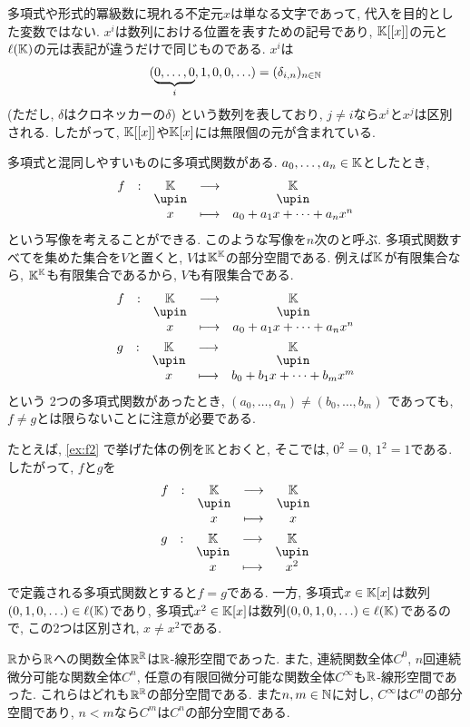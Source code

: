 \begin{remark}
  多項式や形式的冪級数に現れる不定元$x$は単なる文字であって,
  代入を目的とした変数ではない.
  $x^i$は数列における位置を表すための記号であり,
  $\mathbb{K}[[x]]$の元と$\ell(\mathbb{K})$の元は表記が違うだけで同じものである.
  $x^i$は
  \begin{align*}
  (\underbrace{0,\ldots,0}_{i},1,0,0,\ldots)=(\delta_{i,n})_{n\in\mathbb{N}}
  \end{align*}
  (ただし, $\delta$はクロネッカーの$\delta$)
  という数列を表しており,
  $j\neq i$なら$x^i$と$x^j$は区別される.
  したがって,
  $\mathbb{K}[[x]]$や$\mathbb{K}[x]$には無限個の元が含まれている.

  多項式と混同しやすいものに多項式関数がある.
  $a_0,\ldots, a_n\in \mathbb{K}$としたとき,
  \begin{align*}
  \shazo{f}{\KK}{\KK}
  {x}{a_0+a_1x+\cdots+a_nx^n}
  \end{align*}
  という写像を考えることができる.
  このような写像を$n$次のと呼ぶ.
  多項式関数すべてを集めた集合を$V$と置くと,
  $V$は$\mathbb{K}^{\mathbb{K}}$の部分空間である.
  例えば$\mathbb{K}$が有限集合なら,
  $\mathbb{K}^{\mathbb{K}}$も有限集合であるから,
  $V$も有限集合である.
  \begin{align*}
  &\shazo{f}{\KK}{\KK}
  {x}{a_0+a_1x+\cdots+a_nx^n}
  \\
  &\shazo{g}{\KK}{\KK}
  {x}{b_0+b_1x+\cdots+b_mx^m}
  \end{align*}
  という
  2つの多項式関数があったとき,
  $(a_0,\ldots,a_n)\neq (b_0,\ldots,b_m)$
  であっても, $f\neq g$とは限らないことに注意が必要である.

  たとえば,
  \cref{ex:f2}
  で挙げた体の例を$\mathbb{K}$とおくと,
  そこでは, $0^2=0$, $1^2=1$である.
  したがって, $f$と$g$を
  \begin{align*}
  &\shazo{f}{\KK}{\KK}
  {x}{x}
  \\
  &\shazo{g}{\KK}{\KK}
  {x}{x^2}
  \end{align*}
  で定義される多項式関数とすると$f=g$である.
  一方, 多項式$x\in\mathbb{K}[x]$は数列$(0,1,0,\ldots)\in\ell(\mathbb{K})$であり,
  多項式$x^2\in\mathbb{K}[x]$は数列$(0,0,1,0,\ldots)\in\ell(\mathbb{K})$であるので,
  この2つは区別され, $x\neq x^2$である.
\end{remark}

\begin{example}
$\mathbb{R}$から$\mathbb{R}$への関数全体$\mathbb{R}^{\mathbb{R}}$は$\mathbb{R}$-線形空間であった.
また, 連続関数全体$C^0$, $n$回連続微分可能な関数全体$C^n$,
任意の有限回微分可能な関数全体$C^\infty$も$\mathbb{R}$-線形空間であった.
これらはどれも$\mathbb{R}^{\mathbb{R}}$の部分空間である.
また$n,m\in \mathbb{N}$に対し, $C^\infty$は$C^n$の部分空間であり,
$n<m$なら$C^m$は$C^n$の部分空間である.
\end{example}

